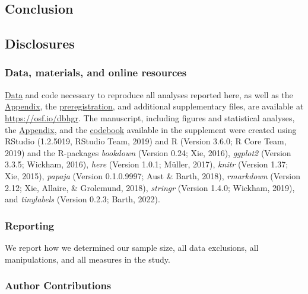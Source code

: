 \documentclass[british,,man,floatsintext]{apa6}
\begin{document}
\hypertarget{conclusion}{%
\subsection{Conclusion}\label{conclusion}}

\hypertarget{disclosures}{%
\subsection{Disclosures}\label{disclosures}}

\hypertarget{data-materials-and-online-resources}{%
\subsubsection{Data, materials, and online resources}\label{data-materials-and-online-resources}}

\href{https://osf.io/aqr2s/}{Data} and code necessary to reproduce all analyses reported here, as well as the \href{https://osf.io/qw798/}{Appendix}, the \href{https://osf.io/sy927/}{preregistration}, and additional supplementary files, are available at \url{https://osf.io/dbhgr}.
The manuscript, including figures and statistical analyses, the \href{https://osf.io/qw798/}{Appendix}, and the \href{https://osf.io/6jrkz/}{codebook} available in the supplement were created using RStudio (1.2.5019, RStudio Team, 2019) and R (Version 3.6.0; R Core Team, 2019) and the R-packages \emph{bookdown} (Version 0.24; Xie, 2016), \emph{ggplot2} (Version 3.3.5; Wickham, 2016), \emph{here} (Version 1.0.1; Müller, 2017), \emph{knitr} (Version 1.37; Xie, 2015), \emph{papaja} (Version 0.1.0.9997; Aust \& Barth, 2018), \emph{rmarkdown} (Version 2.12; Xie, Allaire, \& Grolemund, 2018), \emph{stringr} (Version 1.4.0; Wickham, 2019), and \emph{tinylabels} (Version 0.2.3; Barth, 2022).

\hypertarget{reporting}{%
\subsubsection{Reporting}\label{reporting}}

We report how we determined our sample size, all data exclusions, all manipulations, and all measures in the study.

\hypertarget{author-contributions}{%
\subsubsection{Author Contributions}\label{author-contributions}}
\end{document}
